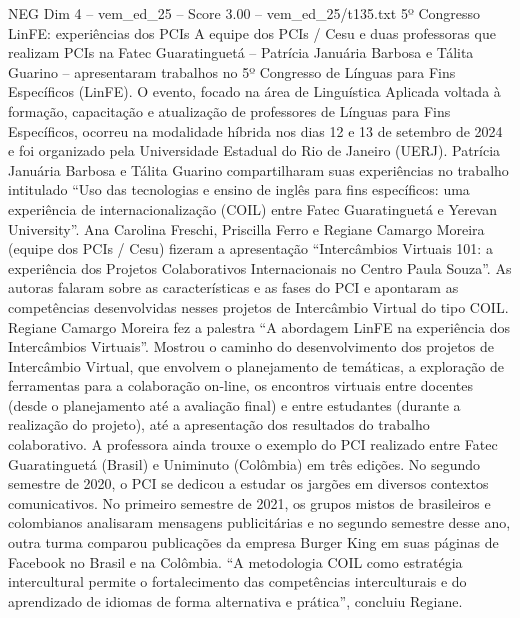 \begin{textsample}{NEG Dim 4 – vem\_ed\_25 – Score 3.00 – vem\_ed\_25/t135.txt}  \label{ex:f4_neg_117}
5º Congresso LinFE: experiências dos PCIs A equipe dos PCIs / Cesu e duas professoras que realizam PCIs na Fatec Guaratinguetá – Patrícia Januária Barbosa e Tálita Guarino – apresentaram trabalhos no 5º Congresso de Línguas para Fins Específicos (LinFE).
O evento, focado na área de Linguística Aplicada voltada à formação, capacitação e atualização de professores de Línguas para Fins Específicos, ocorreu na modalidade híbrida nos dias 12 e 13 de setembro de 2024 e foi organizado pela Universidade Estadual do Rio de Janeiro (UERJ).
Patrícia Januária Barbosa e Tálita Guarino compartilharam suas experiências no trabalho intitulado “Uso das tecnologias e ensino de inglês para fins específicos: uma experiência de internacionalização (COIL) entre Fatec Guaratinguetá e Yerevan University”.
Ana Carolina Freschi, Priscilla Ferro e Regiane Camargo Moreira (equipe dos PCIs / Cesu) fizeram a apresentação “Intercâmbios Virtuais 101: a experiência dos Projetos Colaborativos Internacionais no Centro Paula Souza”.
As autoras falaram sobre as características e as fases do PCI e apontaram as competências desenvolvidas nesses projetos de Intercâmbio Virtual do tipo COIL.
Regiane Camargo Moreira fez a palestra “A abordagem LinFE na experiência dos Intercâmbios Virtuais”.
Mostrou o caminho do desenvolvimento dos projetos de Intercâmbio Virtual, que envolvem o planejamento de temáticas, a exploração de ferramentas para a colaboração on-line, os encontros virtuais entre docentes (desde o planejamento até a avaliação final) e entre estudantes (durante a realização do projeto), até a apresentação dos resultados do trabalho colaborativo.
A professora ainda trouxe o exemplo do PCI realizado entre Fatec Guaratinguetá (Brasil) e Uniminuto (Colômbia) em três edições.
No segundo semestre de 2020, o PCI se dedicou a estudar os jargões em diversos contextos comunicativos.
No primeiro semestre de 2021, os grupos mistos de brasileiros e colombianos analisaram mensagens publicitárias e no segundo semestre desse ano, outra turma comparou publicações da empresa Burger King em suas páginas de Facebook no Brasil e na Colômbia. “A metodologia COIL como estratégia intercultural permite o fortalecimento das competências interculturais e do aprendizado de idiomas de forma alternativa e prática”, concluiu Regiane.

\end{textsample}
